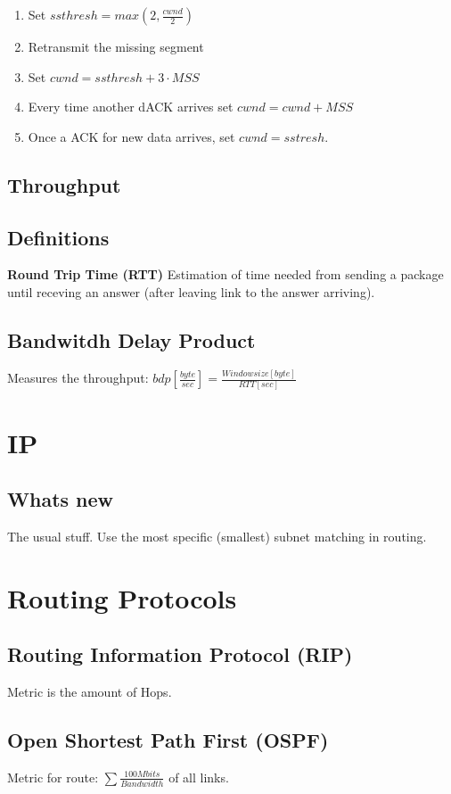 \documentclass{article}
\begin{document}
\begin{enumerate}
     \item Set $ssthresh = max(2, \frac{cwnd}{2})$
     \item Retransmit the missing segment
     \item Set $cwnd = ssthresh + 3 \cdot MSS$
     \item Every time another dACK arrives set $cwnd = cwnd + MSS$
     \item Once a ACK for new data arrives, set $cwnd = sstresh$.
\end{enumerate}

\subsection{Throughput}
\subsection{Definitions}

\textbf{Round Trip Time (RTT)}
Estimation of time needed from sending a package until receving an answer (after leaving link to the answer arriving).

\subsection{Bandwitdh Delay Product}
Measures the throughput: $bdp [\frac{byte}{sec}] = \frac{Windowsize [byte]}{RTT [sec]}$

\section{IP}
\subsection{Whats new}
The usual stuff. Use the most specific (smallest) subnet matching in routing.

\section{Routing Protocols}
\subsection{Routing Information Protocol (RIP)}
Metric is the amount of Hops.

\subsection{Open Shortest Path First (OSPF)}
Metric for route: $\sum{\frac{100 Mbits}{Bandwidth}}$ of all links.
\end{document}
